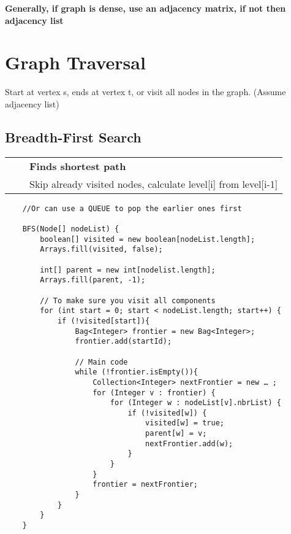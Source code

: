 \documentclass{article}
\newcommand{\tabitem}{~~\llap{\textbullet}~~}
\begin{document}
    \noindent\textbf{Generally, if graph is dense, use an adjacency matrix, if not then adjacency list}

    \pagebreak
    
    \section{Graph Traversal}

    Start at vertex s, ends at vertex t, or visit all nodes in the graph. (Assume adjacency list)
    

    \subsection{Breadth-First Search}

    \begin{tabular}{l}
        \tabitem \textbf{Finds shortest path}\\
        \tabitem Skip already visited nodes, calculate level[i] from level[i-1]\\
    \end{tabular}

    \begin{verbatim}
    //Or can use a QUEUE to pop the earlier ones first

    BFS(Node[] nodeList) {
        boolean[] visited = new boolean[nodeList.length];
        Arrays.fill(visited, false);

        int[] parent = new int[nodelist.length];
        Arrays.fill(parent, -1);

        // To make sure you visit all components 
        for (int start = 0; start < nodeList.length; start++) {
            if (!visited[start]){
                Bag<Integer> frontier = new Bag<Integer>;
                frontier.add(startId);

                // Main code
                while (!frontier.isEmpty()){
                    Collection<Integer> nextFrontier = new … ;
                    for (Integer v : frontier) {
                        for (Integer w : nodeList[v].nbrList) {
                            if (!visited[w]) {
                                visited[w] = true;
                                parent[w] = v;
                                nextFrontier.add(w);
                            }
                        }
                    }
                    frontier = nextFrontier;
                }
            }
        }
    }
    \end{verbatim}
\end{document}
